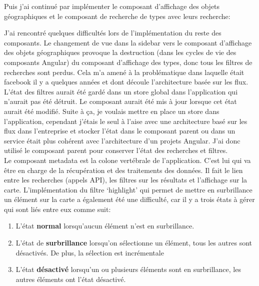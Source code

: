 \documentclass{rapportUHA40}
\begin{document}
Puis j'ai continué par implémenter le composant d'affichage des objets
géographiques et le composant de recherche de types avec leurs recherche:

J'ai rencontré quelques difficultés lors de l'implémentation du reste des
composants. Le changement de vue dans la sidebar vers le composant d'affichage
des objets géographiques provoque la destruction (dans les cycles de vie des
composants Angular) du composant d'affichage des types, donc tous les filtres
de recherches sont perdus. Cela m'a amené à la problématique dans laquelle
était facebook il y a quelques années et dont découle l'architecture basée sur
les flux. L'état des filtres aurait été gardé dans un store global dans
l'application qui n'aurait pas été détruit. Le composant aurait été mis à jour
lorsque cet état aurait été modifié. Suite à ça, je voulais mettre en place un
store dans l'application, cependant j'étais le seul à l'aise avec une
architecture basé sur les flux dans l'entreprise et stocker l'état dans le
composant parent ou dans un service était plus cohérent avec l'architecture
d'un projets Angular. J'ai donc utilisé le composant parent pour conserver
l'état des recherches et filtres.\\

Le composant metadata est la colone vertébrale de l'application. C'est lui qui
va être en charge de la récupération et des traitements des données. Il fait le
lien entre les recherches (appels API), les filtres sur les résultats et
l'affichage sur la carte. L'implémentation du filtre `highlight' qui permet de
mettre en surbrillance un élément sur la carte a également été une difficulté,
car il y a trois états à gérer qui sont liés entre eux comme suit:

\begin{enumerate}
  \item L'état \textbf{normal} lorsqu'aucun élément n'est en surbrillance.
  \item L'état de \textbf{surbrillance} lorsqu'on sélectionne un élément, tous les
        autres sont désactivés. De plus, la sélection est incrémentale
  \item L'état \textbf{désactivé} lorsqu'un ou plusieurs éléments sont en surbrillance,
        les autres éléments ont l'état désactivé.
\end{enumerate}
\end{document}
